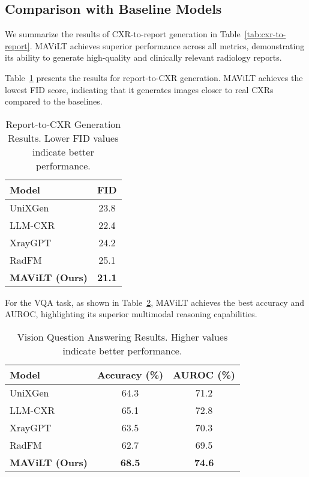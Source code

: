 \subsection{Comparison with Baseline Models}

We summarize the results of CXR-to-report generation in Table~\ref{tab:cxr-to-report}. MAViLT achieves superior performance across all metrics, demonstrating its ability to generate high-quality and clinically relevant radiology reports.



Table~\ref{tab:report-to-cxr} presents the results for report-to-CXR generation. MAViLT achieves the lowest FID score, indicating that it generates images closer to real CXRs compared to the baselines.

\begin{table}[ht]
    \centering
    \caption{Report-to-CXR Generation Results. Lower FID values indicate better performance.}
    \label{tab:report-to-cxr}
    \begin{tabular}{lc}
        \toprule
        \textbf{Model} & \textbf{FID} \\
        \midrule
        UniXGen       & 23.8 \\
        LLM-CXR       & 22.4 \\
        XrayGPT       & 24.2 \\
        RadFM         & 25.1 \\
        \textbf{MAViLT (Ours)} & \textbf{21.1} \\
        \bottomrule
    \end{tabular}
\end{table}

For the VQA task, as shown in Table~\ref{tab:vqa}, MAViLT achieves the best accuracy and AUROC, highlighting its superior multimodal reasoning capabilities.

\begin{table}[ht]
    \centering
    \caption{Vision Question Answering Results. Higher values indicate better performance.}
    \label{tab:vqa}
    \begin{tabular}{lcc}
        \toprule
        \textbf{Model} & \textbf{Accuracy (\%)} & \textbf{AUROC (\%)} \\
        \midrule
        UniXGen       & 64.3 & 71.2 \\
        LLM-CXR       & 65.1 & 72.8 \\
        XrayGPT       & 63.5 & 70.3 \\
        RadFM         & 62.7 & 69.5 \\
        \textbf{MAViLT (Ours)} & \textbf{68.5} & \textbf{74.6} \\
        \bottomrule
    \end{tabular}
\end{table}

